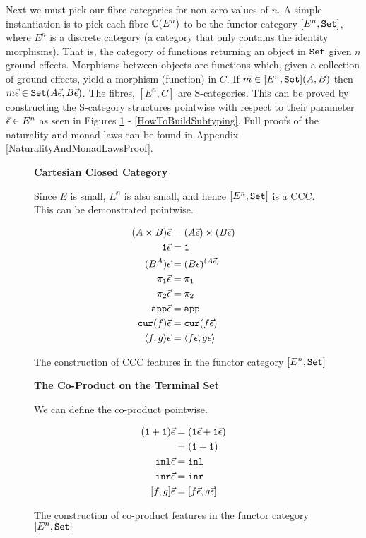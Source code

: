 \documentclass{Report}
\begin{document}
Next we must pick our fibre categories for non-zero values of $n$. A simple instantiation is to pick each fibre $\mathbb{C}(E^n)$ to be the functor category $[E^n, \texttt{Set}]$,  where $E^n$ is a discrete category (a category that only contains the identity morphisms). That is, the category of functions returning an object in $\texttt{Set}$ given $n$ ground effects. Morphisms between objects are functions which, given a collection of ground effects, yield a morphism (function) in $C$. If $m\in [E^n, \texttt{Set}](A, B)$ then $m\vec{\epsilon}\in\texttt{Set}(A\vec{\epsilon}, B\vec{\epsilon})$. The fibres, $[E^n, C]$ are S-categories. This can be proved by constructing the S-category structures pointwise with respect to their parameter $\vec{\epsilon} \in E^n$ as seen in Figures \ref{HowToBuildCCC} - \ref{HowToBuildSubtyping}. Full proofs of the naturality and monad laws can be found in Appendix \ref{NaturalityAndMonadLawsProof}.



\begin{figure}
    
    \begin{framed}
        \centering\textbf{Cartesian Closed Category}

Since $E$ is small, $E^n$ is also small, and hence $[E^n, \texttt{Set}]$ is a CCC. This can be demonstrated pointwise.

\begin{align*}
    (A\times B)\vec{\epsilon} & = (A\vec{\epsilon})\times(B\vec{\epsilon})\\
    \texttt{1}\vec{\epsilon} & = \texttt{1}\\
    (B^A)\vec{\epsilon} &= (B\vec{\epsilon})^{(A\vec{\epsilon})}\\
    \pi_1\vec{\epsilon} & = \pi_1\\
    \pi_2\vec{\epsilon} & = \pi_2\\
    \texttt{app}\vec{\epsilon} & = \texttt{app}\\
    \texttt{cur}(f)\vec{\epsilon} & = \texttt{cur}(f\vec{\epsilon})\\
    \langle f, g\rangle\vec{\epsilon} & = \langle f\vec{\epsilon}, g\vec{\epsilon}\rangle\\
\end{align*}

\end{framed}
\caption{The construction of CCC features in the functor category $[E^n, \texttt{Set}]$}
\label{HowToBuildCCC}
\end{figure}

\begin{figure}
    
\begin{framed}
    \centering\textbf{The Co-Product on the Terminal Set}

We can define the co-product pointwise.

\begin{align*}
    (\texttt{1} + \texttt{1})\vec{\epsilon} & = (\texttt{1}\vec{\epsilon} + \texttt{1}\vec{\epsilon})\\
    & = (\texttt{1} + \texttt{1})\\
    \texttt{inl}\vec{\epsilon} &= \texttt{inl}\\
    \texttt{inr}\vec{\epsilon} &= \texttt{inr}\\
    [f, g]\vec{\epsilon} &= [f\vec{\epsilon}, g\vec{\epsilon}]\\
\end{align*}
\end{framed}
\caption{The construction of co-product features in the functor category $[E^n, \texttt{Set}]$}
\label{HowToBuildCoproduct}
\end{figure}
\end{document}
